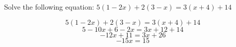 \question Solve the following equation: 
$5(1-2x) + 2(3-x) = 3(x+4) + 14 $
\begin{solution}
	\[
		5(1-2x) + 2(3-x) = 3(x+4) + 14
	\]
	\[
		5 - 10x + 6 - 2x = 3x + 12 + 14
	\]
	\[
		-12x + 11 = 3x + 26
	\]
	\[
		-15x = 15
	\]
\end{solution}

